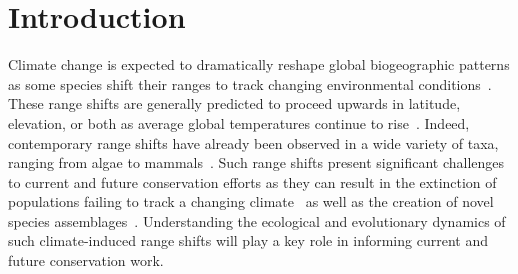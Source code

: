 \documentclass[11pt]{article}
\begin{document}
\newpage{}

\section*{Introduction}
Climate change is expected to dramatically reshape global biogeographic patterns as some species shift their ranges to track changing environmental conditions~\citep{gonzalez2010global}. These range shifts are generally predicted to proceed upwards in latitude, elevation, or both as average global temperatures continue to rise~\citep{loarie2009velocity}. Indeed, contemporary range shifts have already been observed in a wide variety of taxa, ranging from algae to mammals~\citep{chen2011rapid, parmesan2006ecological}. Such range shifts present significant challenges to current and future conservation efforts as they can result in the extinction of populations failing to track a changing climate~\citep{parmesan2006ecological} as well as the creation of novel species assemblages~\citep{hobbs2009novel}. Understanding the ecological and evolutionary dynamics of such climate-induced range shifts will play a key role in informing current and future conservation work.
\end{document}
